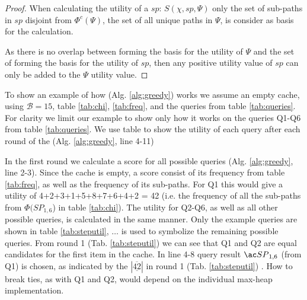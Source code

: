 \begin{proof}

When calculating the utility of a \spath $sp$: $S(\chi, sp, \Psi)$ only the set of sub-paths in $sp$ disjoint from $\Phi^c(\Psi)$, the set of all unique paths in $\Psi$, is consider as basis for the calculation. 

As there is no overlap between \spaths forming the basis for the utility of $\Psi$ and the set of \spaths forming the basis for the utility of $sp$, then any positive utility value of $sp$ can only be added to the $\Psi$ utility value. 

\end{proof}


To show an example of how \salgo (Alg. \ref{alg:greedy}) works we assume an empty cache, using $\mathcal{B}=15$, table \ref{tab:chi}, \ref{tab:freq}, and the queries from table \ref{tab:queries}. For clarity we limit our example to show only how it works on the queries Q1-Q6 from table \ref{tab:queries}. We use table \label{tab:steputil} to show the utility of each query after each round of the \salgo (Alg. \ref{alg:greedy}, line 4-11)

In the first round we calculate a score for all possible queries (Alg. \ref{alg:greedy}, line 2-3). Since the cache is empty, a \spath score consist of its frequency from table \ref{tab:freq}, as well as the frequency of its sub-paths. For Q1 this would give a utility of 4+2+3+1+5+8+7+6+4+2 = 42 (i.e. the frequency of all the sub-paths from $\Phi(SP_{1,6}$) in table \ref{tab:chi}). The utility for Q2-Q6, as well as all other possible queries, is calculated in the same manner. Only the example queries are shown in table \ref{tab:steputil}, $\dots$ is used to symbolize the remaining possible queries. From round 1 (Tab. \ref{tab:steputil}) we can see that Q1 and Q2 are equal candidates for the first item in the cache. In line 4-8 query result $\spath_{1,6}$ (from Q1) is chosen, as indicated by the $| \underline{\overline{42}}|$ in round 1 (Tab. \ref{tab:steputil}) . How to break ties, as with Q1 and Q2, would depend on the individual max-heap implementation. 

